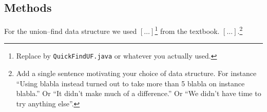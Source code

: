 \documentclass{tufte-handout}
\begin{document}
\subsection{Methods}

For the union--find data structure we used  $[\ldots]$\footnote{Replace by {\tt QuickFindUF.java} or whatever you actually used.}
from the textbook. 
$[\dots]$.\footnote{Add a single sentence motivating your choice of data structure. 
For instance ``Using blabla instead turned out to take more than 5  blabla on instance blabla.''
Or ``It didn't make much of a difference.''
Or ``We didn't have time to try anything else''.}
\end{document}
